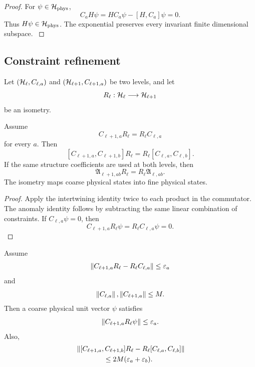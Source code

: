 \begin{proof}\label{strong:proof:070}
For \(\psi\in\mathcal H_{\mathrm{phys}}\),
\[
C_aH\psi
=HC_a\psi-[H,C_a]\psi
=0.
\]
Thus \(H\psi\in\mathcal H_{\mathrm{phys}}\). The exponential preserves every invariant finite dimensional subspace.
\label{strong:proof:070:end}\end{proof}

\subsection{Constraint refinement}\label{strong:subsec:constraint_refinement}

Let \((\mathcal H_\ell,C_{\ell,a})\) and \((\mathcal H_{\ell+1},C_{\ell+1,a})\) be two levels, and let
\[
R_\ell:\mathcal H_\ell\longrightarrow\mathcal H_{\ell+1}
\]
be an isometry.

\begin{theorem}\label{strong:theorem:044}\label{strong:thm:constraint_transport}
Assume
\[
C_{\ell+1,a}R_\ell=R_\ell C_{\ell,a}
\]
for every \(a\). Then
\[
[C_{\ell+1,a},C_{\ell+1,b}]R_\ell
=
R_\ell[C_{\ell,a},C_{\ell,b}].
\]
If the same structure coefficients are used at both levels, then
\[
\mathfrak A_{\ell+1,ab}R_\ell
=
R_\ell\mathfrak A_{\ell,ab}.
\]
The isometry maps coarse physical states into fine physical states.
\end{theorem}

\begin{proof}\label{strong:proof:071}
Apply the intertwining identity twice to each product in the commutator. The anomaly identity follows by subtracting the same linear combination of constraints. If \(C_{\ell,a}\psi=0\), then
\[
C_{\ell+1,a}R_\ell\psi=R_\ell C_{\ell,a}\psi=0.
\]
\label{strong:proof:071:end}\end{proof}

\begin{proposition}\label{strong:proposition:012}\label{strong:prop:approx_constraint_transport}
Assume
\[
\left\lVert C_{\ell+1,a}R_\ell-R_\ell C_{\ell,a}\right\rVert
\leq\varepsilon_a
\]
and
\[
\left\lVert C_{\ell,a}\right\rVert,\left\lVert C_{\ell+1,a}\right\rVert\leq M.
\]
Then a coarse physical unit vector \(\psi\) satisfies
\[
\left\lVert C_{\ell+1,a}R_\ell\psi\right\rVert\leq\varepsilon_a.
\]
Also,
\[
\begin{aligned}
&\left\lVert
[C_{\ell+1,a},C_{\ell+1,b}]R_\ell
-R_\ell[C_{\ell,a},C_{\ell,b}]
\right\rVert\\
&\hspace{4em}\leq
2M(\varepsilon_a+\varepsilon_b).
\end{aligned}
\]
\end{proposition}

